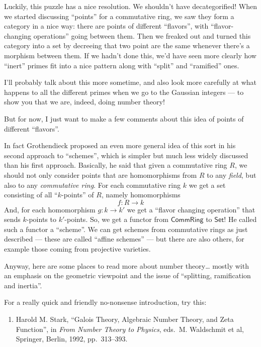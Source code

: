 \documentclass{article}
\def\tightlist{}
\begin{document}
Luckily, this puzzle has a nice resolution. We shouldn't have
decategorified! When we started discussing ``points'' for a commutative
ring, we saw they form a category in a nice way: there are points of
different ``flavors'', with ``flavor-changing operations'' going between
them. Then we freaked out and turned this category into a set by
decreeing that two point are the same whenever there's a morphism
between them. If we hadn't done this, we'd have seen more clearly how
``inert'' primes fit into a nice pattern along with ``split'' and
``ramified'' ones.

I'll probably talk about this more sometime, and also look more
carefully at what happens to all the different primes when we go to the
Gaussian integers --- to show you that we are, indeed, doing number
theory!

But for now, I just want to make a few comments about this idea of
points of different ``flavors''.

In fact Grothendieck proposed an even more general idea of this sort in
his second approach to ``schemes'', which is simpler but much less
widely discussed than his first approach. Basically, he said that given
a commutative ring \(R\), we should not only consider points that are
homomorphisms from \(R\) to any \emph{field}, but also to any
\emph{commutative ring}. For each commutative ring \(k\) we get a set
consisting of all ``\(k\)-points'' of \(R\), namely homomorphisms
\[f\colon R \to k\] And, for each homomorphism \(g\colon k \to k'\) we
get a ``flavor changing operation'' that sends \(k\)-points to
\(k'\)-points. So, we get a functor from \(\mathsf{CommRing}\) to
\(\mathsf{Set}\)! He called such a functor a ``scheme''. We can get
schemes from commutative rings as just described --- these are called
``affine schemes'' --- but there are also others, for example those
coming from projective varieties.

Anyway, here are some places to read more about number theory\ldots{}
mostly with an emphasis on the geometric viewpoint and the issue of
``splitting, ramification and inertia''.

For a really quick and friendly no-nonsense introduction, try this:

\begin{enumerate}
\def\labelenumi{\arabic{enumi})}
\setcounter{enumi}{1}
\tightlist
\item
  Harold M. Stark, ``Galois Theory, Algebraic Number Theory, and Zeta
  Function'', in \emph{From Number Theory to Physics}, eds.~M.
  Waldschmit et al, Springer, Berlin, 1992, pp.~313--393.
\end{enumerate}
\end{document}
